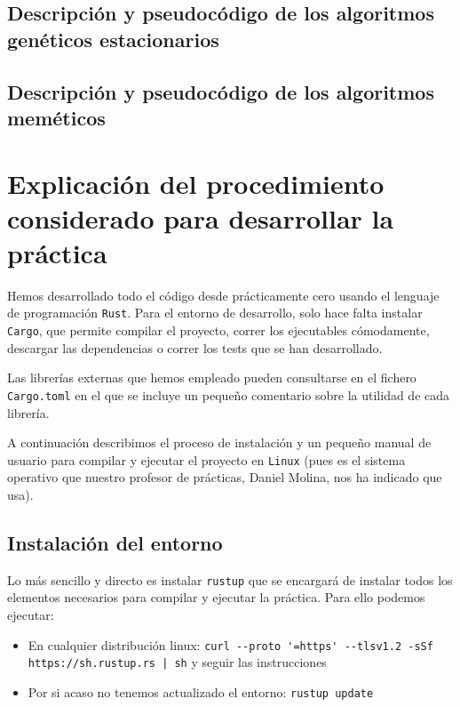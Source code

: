 \documentclass[11pt]{article}
\begin{document}
\pagebreak
\subsection{Descripción y pseudocódigo de los algoritmos genéticos estacionarios}
\pagebreak
\subsection{Descripción y pseudocódigo de los algoritmos meméticos}
\pagebreak

\section{Explicación del procedimiento considerado para desarrollar la práctica}

Hemos desarrollado todo el código desde prácticamente cero usando el lenguaje de programación \lstinline{Rust}. Para el entorno de desarrollo, solo hace falta instalar \lstinline{Cargo}, que permite compilar el proyecto, correr los ejecutables cómodamente, descargar las dependencias o correr los tests que se han desarrollado.

Las librerías externas que hemos empleado pueden consultarse en el fichero \lstinline{Cargo.toml} en el que se incluye un pequeño comentario sobre la utilidad de cada librería.

A continuación describimos el proceso de instalación y un pequeño manual de usuario para compilar y ejecutar el proyecto en \lstinline{Linux} (pues es el sistema operativo que nuestro profesor de prácticas, Daniel Molina, nos ha indicado que usa).

\subsection{Instalación del entorno}

Lo más sencillo y directo es instalar \lstinline{rustup} \footnotemark que se encargará de instalar todos los elementos necesarios para compilar y ejecutar la práctica. Para ello podemos ejecutar:

\begin{itemize}
    \item En cualquier distribución linux: \lstinline{curl --proto '=https' --tlsv1.2 -sSf https://sh.rustup.rs | sh} y seguir las instrucciones
    \item Por si acaso no tenemos actualizado el entorno: \lstinline{rustup update}
\end{itemize}
\end{document}
